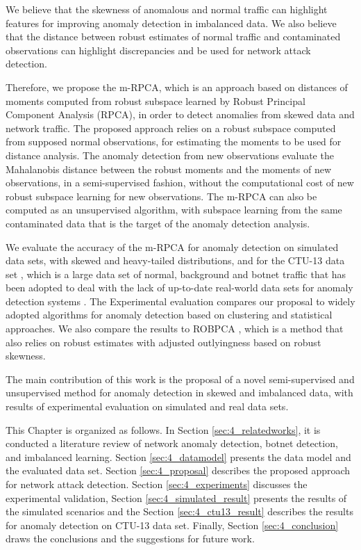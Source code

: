 We believe that the skewness of anomalous and normal traffic can highlight features for improving anomaly detection in imbalanced data. We also believe that the distance between robust estimates of normal traffic and contaminated observations can highlight discrepancies and be used for network attack detection. 

Therefore, we propose the m-RPCA, which is an approach based on distances of moments computed from robust subspace learned by Robust Principal Component Analysis (RPCA), in order to detect anomalies from skewed data and network traffic. The proposed approach relies on a robust subspace computed from supposed normal observations, for estimating the moments to be used for distance analysis. The anomaly detection from new observations evaluate the Mahalanobis distance between the robust moments and the moments of new observations, in a semi-supervised fashion, without the computational cost of new robust subspace learning for new observations. The m-RPCA can also be computed as an unsupervised algorithm, with subspace learning from the same contaminated data that is the target of the anomaly detection analysis.

We evaluate the accuracy of the m-RPCA for anomaly detection on simulated data sets, with skewed and heavy-tailed distributions, and for the CTU-13 data set \cite{garcia2014empirical}, which is a large data set of normal, background and botnet traffic that has been adopted to deal with the lack of up-to-date real-world data sets for anomaly detection systems \cite{osanaiye2016distributed}. The Experimental evaluation compares our proposal to widely adopted algorithms for anomaly detection based on clustering and statistical approaches. We also compare the results to ROBPCA \cite{hubert2005robpca}, which is a method that also relies on robust estimates with adjusted outlyingness based on robust skewness.

The main contribution of this work is the proposal of a novel semi-supervised and unsupervised method for anomaly detection in skewed and imbalanced data, with results of experimental evaluation on simulated and real data sets.

This Chapter is organized as follows. In Section \ref{sec:4_relatedworks}, it is conducted a literature review of network anomaly detection, botnet detection, and imbalanced learning. Section \ref{sec:4_datamodel} presents the data model and the evaluated data set. Section \ref{sec:4_proposal} describes the proposed approach for network attack detection. Section \ref{sec:4_experiments} discusses the experimental validation, Section \ref{sec:4_simulated_result} presents the results of the simulated scenarios and the Section \ref{sec:4_ctu13_result} describes the results for anomaly detection on CTU-13 data set. Finally, Section \ref{sec:4_conclusion} draws the conclusions and the suggestions for future work.


